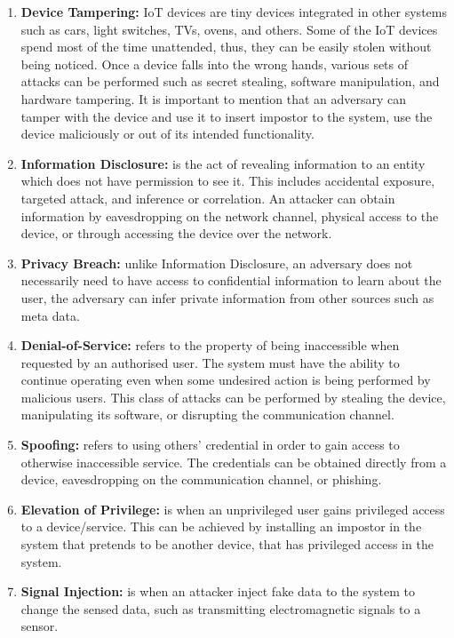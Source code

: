 \documentclass{llncs}
\begin{document}
\begin{enumerate}

\item \textbf{Device Tampering:} IoT devices are tiny devices integrated in other systems such as cars, light switches, TVs, ovens, and others. Some of the IoT devices spend most of the time unattended, thus, they can be easily stolen without being noticed. Once a device falls into the wrong hands, various sets of attacks can be performed such as secret stealing, software manipulation, and hardware tampering. It is important to mention that an adversary can tamper with the device and use it to insert impostor to the system, use the device maliciously or out of its intended functionality. 

\item \textbf{Information Disclosure:} is the act of revealing information to an entity which does not have permission to see it. This includes accidental exposure, targeted attack, and inference or correlation. An attacker can obtain information by eavesdropping on the network channel, physical access to the device, or through accessing the device over the network. 

\item \textbf{Privacy Breach:}  unlike Information Disclosure, an adversary does not necessarily need to have access to confidential information to learn about the user, the adversary can infer private information from other sources such as meta data.

\item \textbf{Denial-of-Service:} refers to the property of being inaccessible when requested by an authorised user. The system must have the ability to continue operating even when some undesired action is being performed by malicious users. This class of attacks can be performed by stealing the device, manipulating its software, or disrupting the communication channel.

\item \textbf{Spoofing:} refers to using others' credential in order to gain access to otherwise inaccessible service. The credentials can be obtained directly from a device, eavesdropping on the communication channel, or phishing. 

\item \textbf{Elevation of Privilege:} is when an unprivileged user gains privileged access to a device/service. This can be achieved by installing an impostor in the system that pretends to be another device, that has privileged access in the system.

\item \textbf{Signal Injection:} is when an attacker inject fake data to the system to change the sensed data, such as transmitting electromagnetic signals to a sensor.
\end{enumerate}
\end{document}
